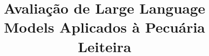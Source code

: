 \documentclass[pdflatex,sn-mathphys-num]{sn-jnl}%
\theoremstyle{thmstyleone}%
\theoremstyle{thmstyletwo}%
\theoremstyle{thmstylethree}%
\begin{document}
\title[Avaliação de Large Language Models Aplicados à Pecuária Leiteira]{Avaliação de Large Language Models Aplicados à Pecuária Leiteira}


\author*[1]{ }

\author[1]{ }



\abstract{}


% 
% 
% 
\end{document}
